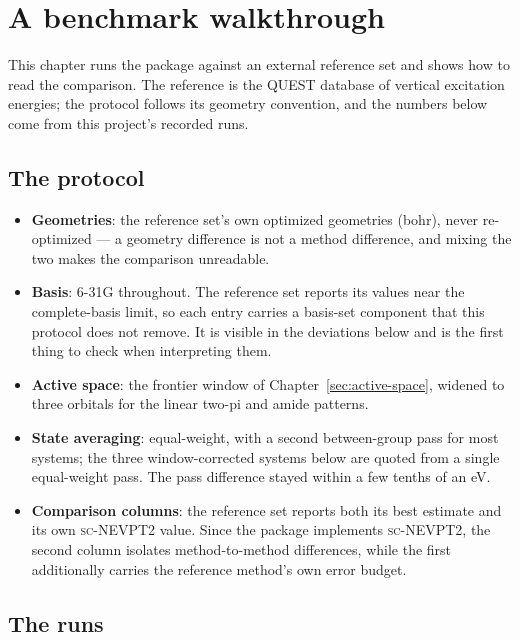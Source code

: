 \section{A benchmark walkthrough}
\label{sec:benchmark-walkthrough}

This chapter runs the package against an external reference set and
shows how to read the comparison.  The reference is the QUEST database
of vertical excitation energies; the protocol follows its geometry
convention, and the numbers below come from this project's recorded
runs.

\subsection{The protocol}

\begin{itemize}
  \item \textbf{Geometries}: the reference set's own optimized
    geometries (bohr), never re-optimized --- a geometry difference is
    not a method difference, and mixing the two makes the comparison
    unreadable.
  \item \textbf{Basis}: 6-31G throughout.  The reference set reports
    its values near the complete-basis limit, so each entry carries a
    basis-set component that this protocol does not remove.  It is
    visible in the deviations below and is the first thing to check
    when interpreting them.
  \item \textbf{Active space}: the frontier window of
    Chapter~\ref{sec:active-space}, widened to three orbitals for the
    linear two-pi and amide patterns.
  \item \textbf{State averaging}: equal-weight, with a second
    between-group pass for most systems; the three window-corrected
    systems below are quoted from a single equal-weight pass.  The
    pass difference stayed within a few tenths of an eV.
  \item \textbf{Comparison columns}: the reference set reports both
    its best estimate and its own \textsc{sc}-NEVPT2 value.  Since the
    package implements \textsc{sc}-NEVPT2, the second column isolates
    method-to-method differences, while the first additionally carries
    the reference method's own error budget.
\end{itemize}

\subsection{The runs}

